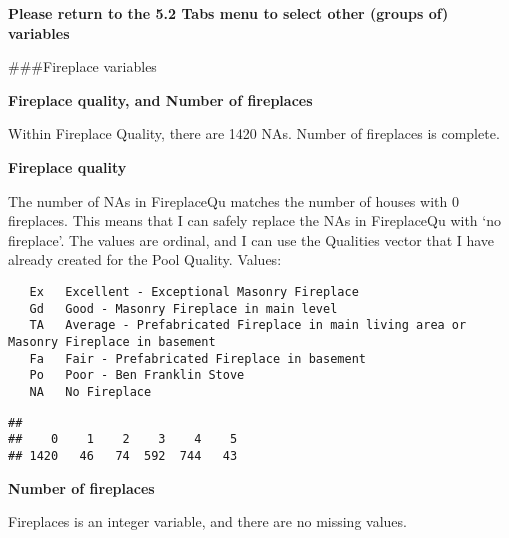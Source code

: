 \documentclass[]{article}
\newenvironment{Shaded}{\begin{snugshade}}{\end{snugshade}}
\newcommand{\KeywordTok}[1]{\textcolor[rgb]{0.13,0.29,0.53}{\textbf{#1}}}
\newcommand{\NormalTok}[1]{#1}
\newcommand{\OperatorTok}[1]{\textcolor[rgb]{0.81,0.36,0.00}{\textbf{#1}}}
\newcommand{\StringTok}[1]{\textcolor[rgb]{0.31,0.60,0.02}{#1}}
\begin{document}
\textbf{Please return to the 5.2 Tabs menu to select other (groups of)
variables}

\#\#\#Fireplace variables

\textbf{Fireplace quality, and Number of fireplaces}

Within Fireplace Quality, there are 1420 NAs. Number of fireplaces is
complete.

\textbf{Fireplace quality}

The number of NAs in FireplaceQu matches the number of houses with 0
fireplaces. This means that I can safely replace the NAs in FireplaceQu
with `no fireplace'. The values are ordinal, and I can use the Qualities
vector that I have already created for the Pool Quality. Values:

\begin{verbatim}
   Ex   Excellent - Exceptional Masonry Fireplace
   Gd   Good - Masonry Fireplace in main level
   TA   Average - Prefabricated Fireplace in main living area or Masonry Fireplace in basement
   Fa   Fair - Prefabricated Fireplace in basement
   Po   Poor - Ben Franklin Stove
   NA   No Fireplace
\end{verbatim}

\begin{Shaded}
\end{Shaded}

\begin{verbatim}
## 
##    0    1    2    3    4    5 
## 1420   46   74  592  744   43
\end{verbatim}

\textbf{Number of fireplaces}

Fireplaces is an integer variable, and there are no missing values.

\begin{Shaded}
\end{Shaded}
\end{document}
